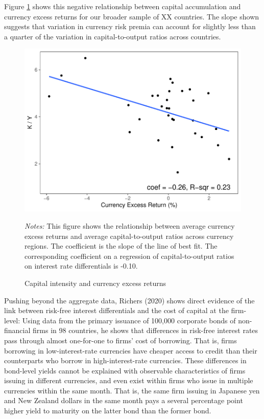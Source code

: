 \documentclass{ar-1col}
\begin{document}
Figure \ref{fig:ky_rx} shows this negative relationship between capital accumulation and currency excess returns for our broader sample of XX countries. The slope shown suggests that variation in currency risk premia can account for slightly less than a quarter of the variation in capital-to-output ratios across countries.
\begin{figure}[htp]
    \centering
    \caption{Capital intensity and currency excess returns}
    \label{fig:ky_rx}
    \includegraphics[width=0.7\linewidth]{Exhibits/Figure_KY_RX.pdf}
    \begin{minipage}[htp]{\textwidth}
    \scriptsize 
    \emph{Notes:} This figure shows the relationship between average currency excess returns and average capital-to-output ratios across currency regions. The coefficient is the slope of the line of best fit. The corresponding coefficient on a regression of capital-to-output ratios on interest rate differentials is -0.10.
    \end{minipage}
\end{figure}

Pushing beyond the aggregate data, Richers (2020) shows direct evidence of the link between  risk-free interest differentials and the cost of capital at the firm-level: Using data from the primary issuance of 100,000 corporate bonds of non-financial firms in 98 countries, he shows that differences in risk-free interest rates pass through almost one-for-one to firms' cost of borrowing. That is, firms borrowing in low-interest-rate currencies have cheaper access to credit than their counterparts who borrow in high-interest-rate currencies. These differences in bond-level yields cannot be explained with observable characteristics of firms issuing in different currencies, and even exist within firms who issue in multiple currencies within the same month. That is, the same firm issuing in Japanese yen and New Zealand dollars in the same month pays a several percentage point higher yield to maturity on the latter bond than the former bond. 
\end{document}
